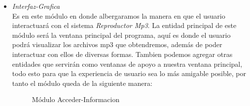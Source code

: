 \documentclass[10pt,letterpaper]{report}
\begin{document}
\begin{itemize}
\begin{figure}[H]

\caption{Módulo Entidades-Compartidas}
\label{fig:informacion-datos}
\end{figure}

\item  \textit{Interfaz-Grafica} \\
\noindent Es en este módulo en donde albergaramos la manera en que el usuario interactuará con el sistema \textit{Reproductor Mp3}. La entidad principal de este módulo será la ventana principal del programa, aquí es donde el usuario podrá visualizar los archivos mp3 que obtendremos, además de poder interactuar con ellos de diversas formas. Tambien podemos agregar otras entidades que servirán como ventanas de apoyo a nuestra ventana principal, todo esto para que la experiencia de usuario sea lo más amigable posible, por tanto el módulo queda de la siguiente manera:

    \begin{figure}[H]
\centering


\caption{Módulo Acceder-Informacion}
\label{fig:obtener-informacion-datos}
\end{figure}


    
\end{itemize}
\end{document}
